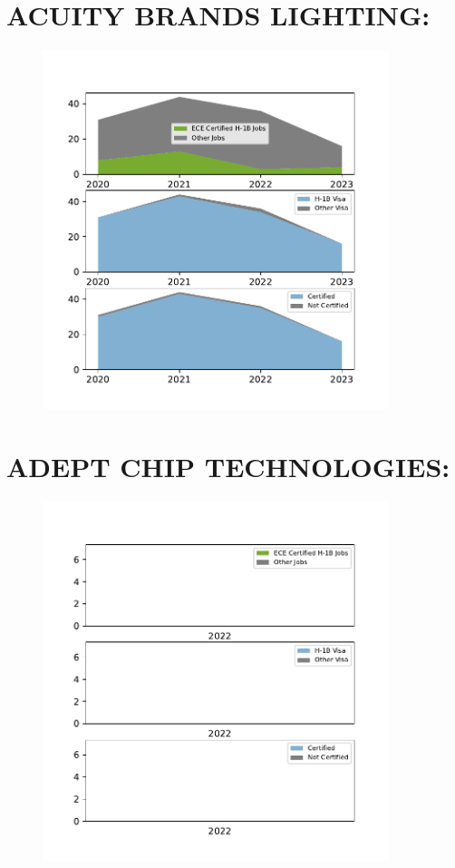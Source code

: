 \documentclass{article}%
\begin{document}
%
\section{ACUITY BRANDS LIGHTING:}%
\label{sec:ACUITYBRANDSLIGHTING}%


\begin{figure}[h]%
\centering%
\includegraphics[width=0.9\textwidth]{./temp_img/ACUITYBRANDSLIGHTING_detailed.pdf}%
\end{figure}

%
\section{ADEPT CHIP TECHNOLOGIES:}%
\label{sec:ADEPTCHIPTECHNOLOGIES}%


\begin{figure}[h]%
\centering%
\includegraphics[width=0.9\textwidth]{./temp_img/ADEPTCHIPTECHNOLOGIES_detailed.pdf}%
\end{figure}
\end{document}
